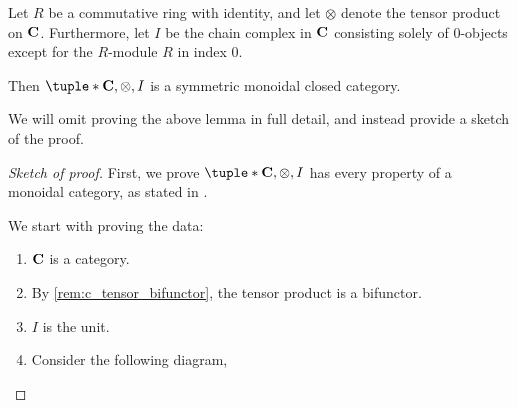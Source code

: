 \begin{lemma}
    \label{lem:c_sym_mon_closed}
    Let \( R \) be a commutative ring with identity, and let \( \otimes \) denote the tensor product on \( \operatorname{\mathbf{C}} \). Furthermore, let \( I \) be the chain complex in \( \operatorname{\mathbf{C}} \) consisting solely of \( 0 \)-objects except for the \( R \)-module \( R \) in index \( 0 \).

    Then \( \tuple*{\C, \otimes, I} \) is a symmetric monoidal closed category.
\end{lemma}

We will omit proving the above lemma in full detail, and instead provide a sketch of the proof.
\begin{proof}[Sketch of proof]
    First, we prove \( \tuple*{\C, \otimes, I} \) has every property of a monoidal category, as stated in \cite[Definition 6.1.1]{Borceux_1994}.

    We start with proving the data:
    \begin{enumerate}
        \item {
            \( \operatorname{\mathbf{C}} \) is a category.
        }
        \item {
            By \autoref{rem:c_tensor_bifunctor}, the tensor product is a bifunctor.
        }
        \item {
            \( I \) is the unit.
        }
        \item {
            Consider the following diagram,
            \begin{center}
\end{center}}
\end{enumerate}
\end{proof}
